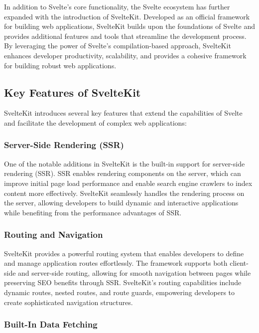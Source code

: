 In addition to Svelte's core functionality, the Svelte ecosystem has further expanded with the introduction of SvelteKit. Developed as an official framework for building web applications, SvelteKit builds upon the foundations of Svelte and provides additional features and tools that streamline the development process. By leveraging the power of Svelte's compilation-based approach, SvelteKit enhances developer productivity, scalability, and provides a cohesive framework for building robust web applications.

\subsection{Key Features of SvelteKit}

SvelteKit introduces several key features that extend the capabilities of Svelte and facilitate the development of complex web applications:

\subsubsection{Server-Side Rendering (SSR)}

One of the notable additions in SvelteKit is the built-in support for server-side rendering (SSR). SSR enables rendering components on the server, which can improve initial page load performance and enable search engine crawlers to index content more effectively. SvelteKit seamlessly handles the rendering process on the server, allowing developers to build dynamic and interactive applications while benefiting from the performance advantages of SSR.

\subsubsection{Routing and Navigation}

SvelteKit provides a powerful routing system that enables developers to define and manage application routes effortlessly. The framework supports both client-side and server-side routing, allowing for smooth navigation between pages while preserving SEO benefits through SSR. SvelteKit's routing capabilities include dynamic routes, nested routes, and route guards, empowering developers to create sophisticated navigation structures.

\subsubsection{Built-In Data Fetching}

